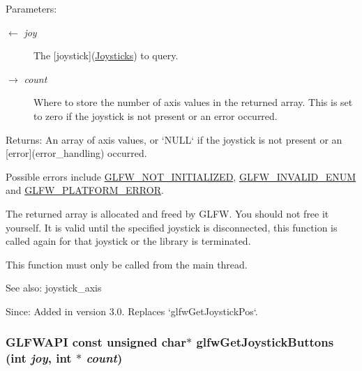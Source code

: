 \begin{Desc}
\item[Parameters:]
\begin{description}
\item[\mbox{$\leftarrow$} {\em joy}]The \mbox{[}joystick\mbox{]}(\hyperlink{group__joysticks}{Joysticks}) to query. \item[\mbox{$\rightarrow$} {\em count}]Where to store the number of axis values in the returned array. This is set to zero if the joystick is not present or an error occurred. \end{description}
\end{Desc}
\begin{Desc}
\item[Returns:]An array of axis values, or `NULL` if the joystick is not present or an \mbox{[}error\mbox{]}(error\_\-handling) occurred.\end{Desc}
Possible errors include \hyperlink{group__errors_g2374ee02c177f12e1fa76ff3ed15e14a}{GLFW\_\-NOT\_\-INITIALIZED}, \hyperlink{group__errors_g76f6bb9c4eea73db675f096b404593ce}{GLFW\_\-INVALID\_\-ENUM} and \hyperlink{group__errors_gd44162d78100ea5e87cdd38426b8c7a1}{GLFW\_\-PLATFORM\_\-ERROR}.

The returned array is allocated and freed by GLFW. You should not free it yourself. It is valid until the specified joystick is disconnected, this function is called again for that joystick or the library is terminated.

This function must only be called from the main thread.

\begin{Desc}
\item[See also:]joystick\_\-axis\end{Desc}
\begin{Desc}
\item[Since:]Added in version 3.0. Replaces `glfwGetJoystickPos`. \end{Desc}
\hypertarget{group__input_g3951bea72b5fb4870b1aa0e5c2e9c903}{
\subsubsection[glfwGetJoystickButtons]{\setlength{\rightskip}{0pt plus 5cm}GLFWAPI const unsigned char$\ast$ glfwGetJoystickButtons (int {\em joy}, \/  int $\ast$ {\em count})}}
\label{group__input_g3951bea72b5fb4870b1aa0e5c2e9c903}


